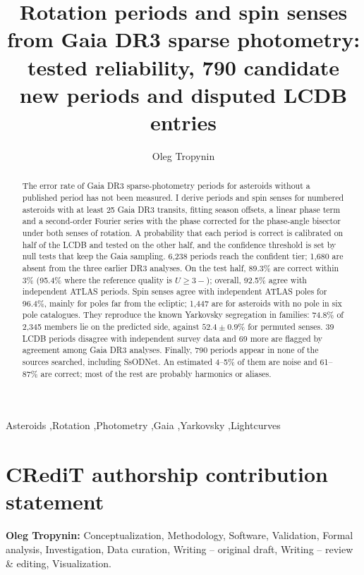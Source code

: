 \documentclass[preprint,12pt,authoryear]{elsarticle}
\begin{document}
\begin{frontmatter}

\title{Rotation periods and spin senses from Gaia DR3 sparse photometry: tested reliability, 790 candidate new periods and disputed LCDB entries}

\author{Oleg Tropynin}
\address{Independent researcher, Karaganda, Kazakhstan}

\begin{abstract}
The error rate of Gaia DR3 sparse-photometry periods for asteroids without a published period has not
been measured. I derive periods and spin senses for numbered asteroids with at
least 25 Gaia DR3 transits, fitting season offsets, a linear phase term and a second-order Fourier series
with the phase corrected for the phase-angle bisector under both senses of rotation. A probability that
each period is correct is calibrated on half of the LCDB and tested on the other half, and the confidence
threshold is set by null tests that keep the Gaia sampling. 6{,}238 periods reach the confident tier;
1{,}680 are absent from the three earlier DR3 analyses. On the test half, 89.3\% are correct within 3\%
(95.4\% where the reference quality is $U\ge3-$); overall, 92.5\% agree with independent ATLAS periods. Spin
senses agree with independent ATLAS poles for 96.4\%, mainly for poles far from the ecliptic; 1{,}447 are for asteroids with no pole in six pole catalogues. They reproduce the known Yarkovsky segregation in families: 74.8\% of
2{,}345 members lie on the predicted side, against $52.4\pm0.9\%$ for permuted senses. 39 LCDB periods
disagree with independent survey data and 69 more are flagged by agreement among Gaia DR3 analyses.
Finally, 790 periods appear in none of the sources searched, including SsODNet. An estimated 4--5\% of
them are noise and 61--87\% are correct; most of the rest are probably harmonics or aliases.
\end{abstract}

\begin{keyword}
Asteroids \sep Rotation \sep Photometry \sep Gaia \sep Yarkovsky \sep Lightcurves
\end{keyword}

\end{frontmatter}



\section*{CRediT authorship contribution statement}
\textbf{Oleg Tropynin:} Conceptualization, Methodology, Software, Validation, Formal analysis, Investigation,
Data curation, Writing -- original draft, Writing -- review \& editing, Visualization.
\end{document}

